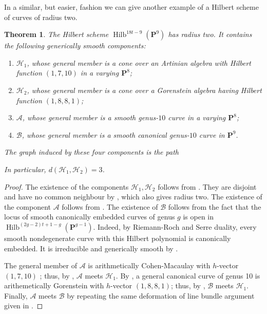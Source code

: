 \documentclass[leqno,11pt,a4paper]{amsart}
\newtheorem{thm}{Theorem}[section]
\theoremstyle{definition}
\numberwithin{equation}{section}
\newcommand{\PP}{\mathbf{P}}
\newcommand{\HH}{\mathcal{H}}
\DeclareMathOperator{\Hilb}{Hilb}
\begin{document}
In a similar, but easier, fashion we can give another example of a Hilbert scheme of curves of radius two.

\begin{thm}\label{radius_two_18}
The Hilbert scheme $\Hilb^{18t-9}(\PP^9)$ has radius two.
It contains the following generically smooth components:
\begin{enumerate}
\item $\HH_1$, whose general member is a cone over an Artinian
algebra with Hilbert function $(1,7,10)$ in a varying $\PP^8$;
\item $\HH_2$, whose general member is a cone over a Gorenstein
algebra having Hilbert function $(1,8,8,1)$;
\item $\mathcal A$, whose general member is a smooth genus-$10$
curve in a varying $\PP^8$;
\item $\mathcal B$, whose general member is a smooth canonical
genus-$10$ curve in $\PP^9$.
\end{enumerate}
The graph induced by these four components is the path
\begin{center}
\end{center}
In particular, $d(\HH_1,\HH_2)=3$.
\end{thm}

\begin{proof}
The existence of the  components $\HH_1,\HH_2$ follows from .
They are disjoint and have no common neighbour by , which also gives radius two.
The existence of the component $\mathcal A$ follows from . 
The existence of $\mathcal{B}$ follows from the fact that the locus of smooth canonically embedded curves of genus $g$ is open in $\Hilb^{(2g-2)t+1-g}(\PP^{g-1})$. 
Indeed, by Riemann-Roch and Serre duality, every smooth nondegenerate curve with this Hilbert polynomial is canonically embedded. It is irreducible and generically smooth by \cite[Example 3.2.5(vi)]{Sernesi__Deformations}. 

The general member of $\mathcal{A}$ is arithmetically Cohen-Macaulay with $h$-vector $(1,7,10)$ \cite[Corollary 8.4]{eisenbud:syzygies}; thus, by , $\mathcal{A}$ meets $\HH_1$. By \cite[Section 9.1]{eisenbud:syzygies}, a general canonical curve of genus 10 is arithemetically Gorenstein with $h$-vector $(1,8,8,1)$; thus, by , $\mathcal{B}$ meets $\HH_1$. 
Finally, $\mathcal{A}$ meets $\mathcal{B}$ by repeating the same deformation of line bundle argument given in .
\end{proof}
\end{document}
